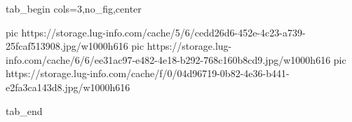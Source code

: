  
 
 
 
 


\ifcmt
  tab_begin cols=3,no_fig,center

     pic https://storage.lug-info.com/cache/5/6/cedd26d6-452e-4c23-a739-25fcaf513908.jpg/w1000h616
		 pic https://storage.lug-info.com/cache/6/6/ee31ac97-e482-4e18-b292-768c160b8cd9.jpg/w1000h616
		 pic https://storage.lug-info.com/cache/f/0/04d96719-0b82-4e36-b441-e2fa3ca143d8.jpg/w1000h616

  tab_end
\fi
